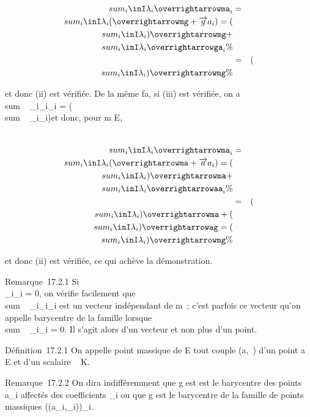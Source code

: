 \documentclass[]{article}
\begin{document}
\begin{align*} \\sum
_i\inI\lambda_i\overrightarrowma_i&
=& \\sum
_i\inI\lambda_i(\overrightarrowmg
+\overrightarrow ga_i) =
(\\sum
_i\inI\lambda_i)\overrightarrowmg +
\\sum
_i\inI\lambda_i\overrightarrowga_i\%&
\\ & =& (\\sum
_i\inI\lambda_i)\overrightarrowmg \%&
\\ \end{align*}

et donc (ii) est vérifiée. De la même fa\ccon, si
(iii) est vérifiée, on a
\\sum ~
_i\inI\lambda_i\overrightarrowaa_i =
(\\sum ~
_i\inI\lambda_i)\overrightarrowag et donc,
pour m \in E,

\begin{align*} \\sum
_i\inI\lambda_i\overrightarrowma_i&
=& \\sum
_i\inI\lambda_i(\overrightarrowma
+\overrightarrow aa_i) =
(\\sum
_i\inI\lambda_i)\overrightarrowma +
\\sum
_i\inI\lambda_i\overrightarrowaa_i\%&
\\ & =& (\\sum
_i\inI\lambda_i)\overrightarrowma +
(\\sum
_i\inI\lambda_i)\overrightarrowag =
(\\sum
_i\inI\lambda_i)\overrightarrowmg \%&
\\ \end{align*}

et donc (ii) est vérifiée, ce qui achève la démonstration.

Remarque~17.2.1 Si \\\sum
 _i\inI\lambda_i = 0, on vérifie facilement que
\\sum ~
_i\inI\lambda_i\overrightarrowma_i
est un vecteur \vecu indépendant de m~; c'est parfois
ce vecteur qu'on appelle barycentre de la famille lorsque
\\sum ~
_i\inI\lambda_i = 0. Il s'agit alors d'un vecteur et non plus
d'un point.

Définition~17.2.1 On appelle point massique de E tout couple (a,\lambda~) d'un
point a \in E et d'un scalaire \lambda~ \in K.

Remarque~17.2.2 On dira indifféremment que g est est le barycentre des
points a_i affectés des coefficients \lambda_i ou que g est
le barycentre de la famille de points massiques \left
((a_i,\lambda_i)\right )_i\inI.
\end{document}
